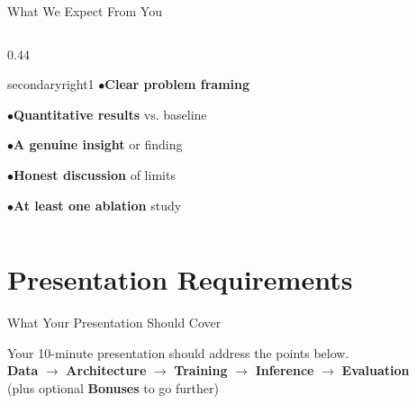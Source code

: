 \documentclass[aspectratio=169]{beamer}
\newcommand{\qitem}[1]{\textcolor{secondary}{\footnotesize$\bullet$}\hspace{4pt}#1\par\vspace{3pt}}
\begin{document}
\begin{frame}{What We Expect From You}
\begin{columns}[T]
\begin{column}{0.44\textwidth}
\begin{qbox}{secondary}{right1}
        \qitem{\textbf{Clear problem framing}}
        \qitem{\textbf{Quantitative results} vs. baseline}
        \qitem{\textbf{A genuine insight} or finding}
        \qitem{\textbf{Honest discussion} of limits}
        \qitem{\textbf{At least one ablation} study}

        \vspace{0.5cm}
        \centering
      \end{qbox}
    \end{column}
  \end{columns}
 \end{frame}
\section{Presentation Requirements}

\begin{frame}{What Your Presentation Should Cover}
  \begin{center}
    \vspace{0.4cm}
    \large Your 10-minute presentation should address the points below.\\[0.5cm]
    \small
    \textbf{Data} $\rightarrow$ \textbf{Architecture} $\rightarrow$
    \textbf{Training} $\rightarrow$ \textbf{Inference} $\rightarrow$
    \textbf{Evaluation} \\[0.2cm]
    (plus optional \textbf{Bonuses} to go further)
  \end{center}
\end{frame}
\end{document}
